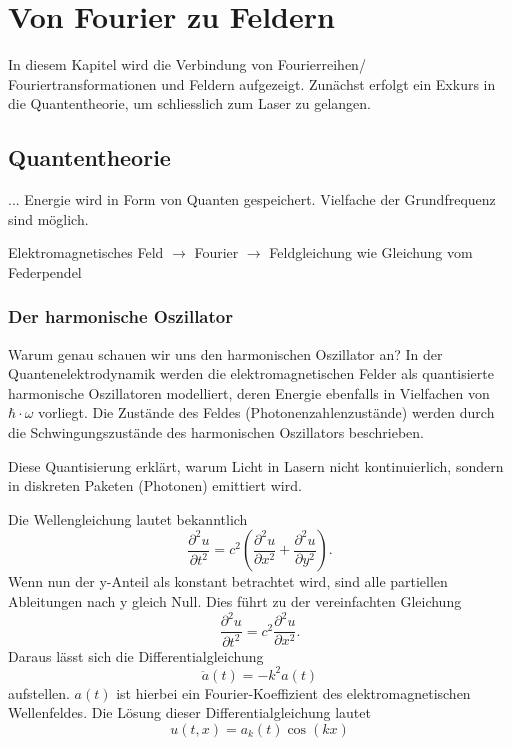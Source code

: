 %
%
%
%

\section{Von Fourier zu Feldern
\label{fourier:section:vonFourierZuFeldern}}
In diesem Kapitel wird die Verbindung von Fourierreihen/ Fouriertransformationen und Feldern aufgezeigt.
Zunächst erfolgt ein Exkurs in die Quantentheorie, um schliesslich zum Laser zu gelangen. %

\subsection{Quantentheorie
\label{fourier:subsection:Quantentheorie}}
...
Energie wird in Form von Quanten gespeichert.
Vielfache der Grundfrequenz sind möglich.

Elektromagnetisches Feld $\rightarrow$ Fourier $\rightarrow$ Feldgleichung wie Gleichung vom Federpendel

\subsubsection{Der harmonische Oszillator
\label{fourier:subsubsection:derHarmonischeOszillator}}
Warum genau schauen wir uns den harmonischen Oszillator an?
In der Quantenelektrodynamik werden die elektromagnetischen Felder als quantisierte harmonische Oszillatoren modelliert, deren Energie ebenfalls in Vielfachen von $\hbar\cdot\omega$ vorliegt.
Die Zustände des Feldes (Photonenzahlenzustände) werden durch die Schwingungszustände des harmonischen Oszillators beschrieben.

Diese Quantisierung erklärt, warum Licht in Lasern nicht kontinuierlich, sondern in diskreten Paketen (Photonen) emittiert wird. %

Die Wellengleichung lautet bekanntlich
\begin{equation}
    \frac{\partial^2 u}{\partial t^2} = c^2 \left( \frac{\partial^2 u}{\partial x^2} + \frac{\partial^2 u}{\partial y^2} \right).
\end{equation}
Wenn nun der y-Anteil als konstant betrachtet wird, sind alle partiellen Ableitungen nach y gleich Null.
Dies führt zu der vereinfachten Gleichung
\begin{equation}
    \frac{\partial^2 u}{\partial t^2} = c^2 \frac{\partial^2 u}{\partial x^2}.
\end{equation}
Daraus lässt sich die Differentialgleichung
\begin{equation}
    \ddot{a}(t) = -k^2 a(t)
\end{equation}
aufstellen.
$a(t)$ ist hierbei ein Fourier-Koeffizient des elektromagnetischen Wellenfeldes.
Die Lösung dieser Differentialgleichung lautet
\begin{equation}
    u(t,x) = a_k(t) \cos(kx)
\end{equation}

